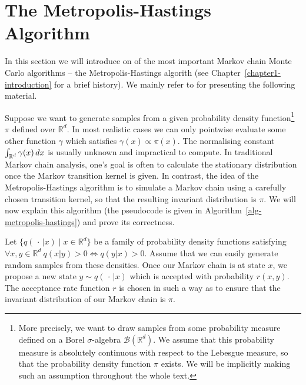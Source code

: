 \documentclass[report.tex]{subfiles}
\begin{document}
\section{The Metropolis-Hastings Algorithm}
In this section we will introduce on of the most important Markov chain Monte Carlo
algorithms -- the Metropolis-Hastings algorith (see Chapter~\ref{chapter1-introduction}
for a brief history).
We mainly refer to \citet{liu2008monte} for presenting the following material.

Suppose we want to generate samples from a given probability density function\footnote{
  More precisely, we want to draw samples from some probability measure
  defined on a Borel $\sigma$-algebra $\mathcal{B}(\mathbb{R}^{d})$. We assume
  that this probability measure is absolutely continuous with respect to the
  Lebesgue measure, so that the probability density function $\pi$ exists.
  We will be implicitly making such an assumption throughout the whole text.
}
$\pi$ defined over $\mathbb{R}^{d}$. In most
realistic cases we can only pointwise evaluate some other function $\gamma$ which
satisfies $\gamma(x) \propto \pi(x)$.
The normalising constant
$\int_{{\mathbb{R}^{d}}}^{{}} {\gamma(x)}\, d{x}$ is usually unknown and impractical
to compute.
In traditional Markov chain analysis, one's goal is often to calculate
the stationary distribution once the Markov transition kernel is given.
In contrast, the idea of the Metropolis-Hastings algorithm is to
simulate a Markov chain using a carefully chosen transition kernel,
so that the resulting invariant distribution is $\pi$.
We will now explain this algorithm
(the pseudocode is given in Algorithm~\ref{alg-metropolis-hastings})
and prove its correctness.

Let $\{q(\,\cdot\, \vert x) \mid x \in \mathbb{R}^d\}$
be a family of probability density functions satisfying
$\forall x,y \in \mathbb{R}^{d}\ q(x \vert y) > 0 \Leftrightarrow q(y \vert x) > 0$.
Assume that we can easily generate random samples from these densities.
Once our Markov chain is at state $x$, we propose a new state
$y \sim q(\,\cdot\, \vert x)$ which is accepted with probability
$r(x, y)$. The acceptance rate function $r$ is chosen in such a way as to
ensure that the invariant distribution of our Markov chain is $\pi$.
\end{document}
